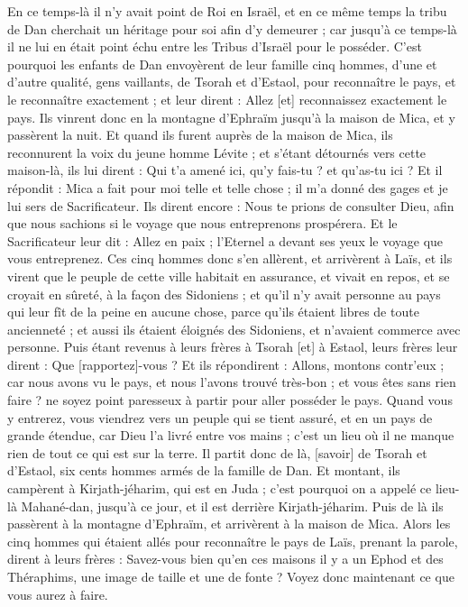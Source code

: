 \begin{multicols}{2}
\VerseOne{}En ce temps-là il n'y avait point de Roi en Israël, et en ce même temps la tribu de Dan cherchait un héritage pour soi afin d'y demeurer ; car jusqu'à ce temps-là il ne lui en était point échu entre les Tribus d'Israël pour le posséder.
C'est pourquoi les enfants de Dan envoyèrent de leur famille cinq hommes, d'une et d'autre qualité, gens vaillants, de Tsorah et d'Estaol, pour reconnaître le pays, et le reconnaître exactement ; et leur dirent : Allez [et] reconnaissez exactement le pays. Ils vinrent donc en la montagne d'Ephraïm jusqu'à la maison de Mica, et y passèrent la nuit.
Et quand ils furent auprès de la maison de Mica, ils reconnurent la voix du jeune homme Lévite ; et s'étant détournés vers cette maison-là, ils lui dirent : Qui t'a amené ici, qu'y fais-tu ? et qu'as-tu ici ?
Et il répondit : Mica a fait pour moi telle et telle chose ; il m'a donné des gages et je lui sers de Sacrificateur.
Ils dirent encore : Nous te prions de consulter Dieu, afin que nous sachions si le voyage que nous entreprenons prospérera.
Et le Sacrificateur leur dit : Allez en paix ; l'Eternel a devant ses yeux le voyage que vous entreprenez.
Ces cinq hommes donc s'en allèrent, et arrivèrent à Laïs, et ils virent que le peuple de cette ville habitait en assurance, et vivait en repos, et se croyait en sûreté, à la façon des Sidoniens ; et qu'il n'y avait personne au pays qui leur fît de la peine en aucune chose, parce qu'ils étaient libres de toute ancienneté ; et aussi ils étaient éloignés des Sidoniens, et n'avaient commerce avec personne.
Puis étant revenus à leurs frères à Tsorah [et] à Estaol, leurs frères leur dirent : Que [rapportez]-vous ?
Et ils répondirent : Allons, montons contr'eux ; car nous avons vu le pays, et nous l'avons trouvé très-bon ; et vous êtes sans rien faire ? ne soyez point paresseux à partir pour aller posséder le pays.
Quand vous y entrerez, vous viendrez vers un peuple qui se tient assuré, et en un pays de grande étendue, car Dieu l'a livré entre vos mains ; c'est un lieu où il ne manque rien de tout ce qui est sur la terre.
Il partit donc de là, [savoir] de Tsorah et d'Estaol, six cents hommes armés de la famille de Dan.
Et montant, ils campèrent à Kirjath-jéharim, qui est en Juda ; c'est pourquoi on a appelé ce lieu-là Mahané-dan, jusqu'à ce jour, et il est derrière Kirjath-jéharim.
Puis de là ils passèrent à la montagne d'Ephraïm, et arrivèrent à la maison de Mica.
Alors les cinq hommes qui étaient allés pour reconnaître le pays de Laïs, prenant la parole, dirent à leurs frères : Savez-vous bien qu'en ces maisons il y a un Ephod et des Théraphims, une image de taille et une de fonte ? Voyez donc maintenant ce que vous aurez à faire.

\end{multicols}
